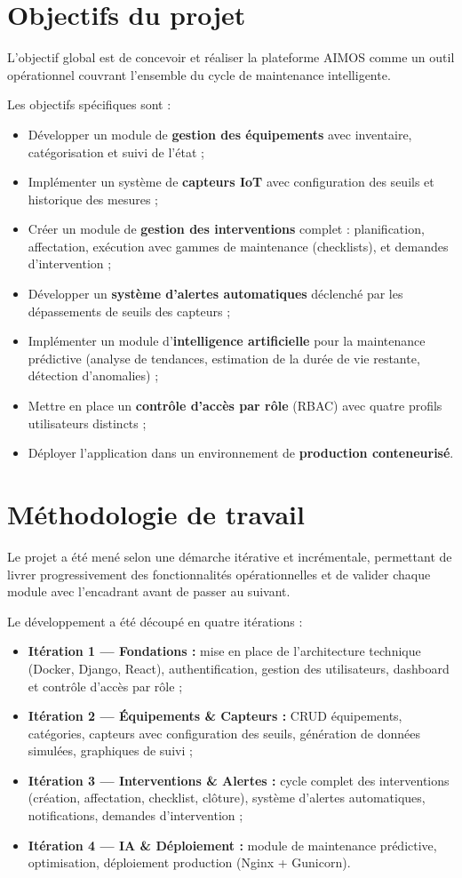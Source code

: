 \section{Objectifs du projet}
L'objectif global est de concevoir et réaliser la plateforme AIMOS comme un outil opérationnel couvrant l'ensemble du cycle de maintenance intelligente.

Les objectifs spécifiques sont :
\begin{itemize}
    \item Développer un module de \textbf{gestion des équipements} avec inventaire, catégorisation et suivi de l'état ;
    \item Implémenter un système de \textbf{capteurs IoT} avec configuration des seuils et historique des mesures ;
    \item Créer un module de \textbf{gestion des interventions} complet : planification, affectation, exécution avec gammes de maintenance (checklists), et demandes d'intervention ;
    \item Développer un \textbf{système d'alertes automatiques} déclenché par les dépassements de seuils des capteurs ;
    \item Implémenter un module d'\textbf{intelligence artificielle} pour la maintenance prédictive (analyse de tendances, estimation de la durée de vie restante, détection d'anomalies) ;
    \item Mettre en place un \textbf{contrôle d'accès par rôle} (RBAC) avec quatre profils utilisateurs distincts ;
    \item Déployer l'application dans un environnement de \textbf{production conteneurisé}.
\end{itemize}

\section{Méthodologie de travail}
Le projet a été mené selon une démarche itérative et incrémentale, permettant de livrer progressivement des fonctionnalités opérationnelles et de valider chaque module avec l'encadrant avant de passer au suivant.

Le développement a été découpé en quatre itérations :

\begin{itemize}
    \item \textbf{Itération 1 — Fondations :} mise en place de l'architecture technique (Docker, Django, React), authentification, gestion des utilisateurs, dashboard et contrôle d'accès par rôle ;
    \item \textbf{Itération 2 — Équipements \& Capteurs :} CRUD équipements, catégories, capteurs avec configuration des seuils, génération de données simulées, graphiques de suivi ;
    \item \textbf{Itération 3 — Interventions \& Alertes :} cycle complet des interventions (création, affectation, checklist, clôture), système d'alertes automatiques, notifications, demandes d'intervention ;
    \item \textbf{Itération 4 — IA \& Déploiement :} module de maintenance prédictive, optimisation, déploiement production (Nginx + Gunicorn).
\end{itemize}

